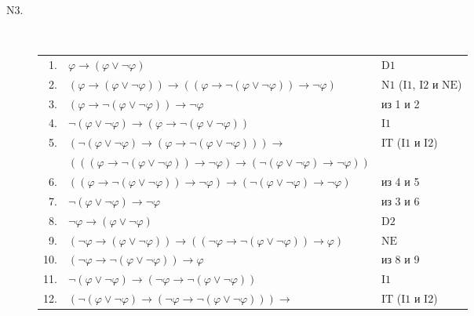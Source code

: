 \documentclass[12pt,a4paper]{article}
\begin{document}
\begin{enumproblem}
\begin{description}
            \item[$\mathrm{N3}$.]\ 
                \begin{center}
                    \begin{tabular}{rll}
                        1.& $\varphi \rightarrow (\varphi \vee \neg \varphi)$& $\mathrm{D1}$\\
                        2.& $(\varphi \rightarrow (\varphi \vee \neg \varphi)) \rightarrow ((\varphi \rightarrow \neg (\varphi \vee \neg \varphi)) \rightarrow \neg \varphi)$& $\mathrm{N1}$ ($\mathrm{I1}$, $\mathrm{I2}$ и $\mathrm{NE}$)\\
                        3.& $(\varphi \rightarrow \neg (\varphi \vee \neg \varphi)) \rightarrow \neg \varphi$& из 1 и 2\\
                        4.& $\neg (\varphi \vee \neg \varphi) \rightarrow (\varphi \rightarrow \neg (\varphi \vee \neg \varphi))$& $\mathrm{I1}$\\
                        5.& $(\neg (\varphi \vee \neg \varphi) \rightarrow (\varphi \rightarrow \neg (\varphi \vee \neg \varphi))) \rightarrow$& $\mathrm{IT}$ ($\mathrm{I1}$ и $\mathrm{I2}$)\\
                        &$(((\varphi \rightarrow \neg (\varphi \vee \neg \varphi)) \rightarrow \neg \varphi) \rightarrow (\neg (\varphi \vee \neg \varphi) \rightarrow \neg \varphi))$&\\
                        6.& $((\varphi \rightarrow \neg (\varphi \vee \neg \varphi)) \rightarrow \neg \varphi) \rightarrow (\neg (\varphi \vee \neg \varphi) \rightarrow \neg \varphi)$& из 4 и 5\\
                        7.& $\neg (\varphi \vee \neg \varphi) \rightarrow \neg \varphi$& из 3 и 6\\
                        8.& $\neg \varphi \rightarrow (\varphi \vee \neg \varphi)$& $\mathrm{D2}$\\
                        9.& $(\neg \varphi \rightarrow (\varphi \vee \neg \varphi)) \rightarrow ((\neg \varphi \rightarrow \neg (\varphi \vee \neg \varphi)) \rightarrow \varphi)$& $\mathrm{NE}$\\
                        10.& $(\neg \varphi \rightarrow \neg (\varphi \vee \neg \varphi)) \rightarrow \varphi$& из 8 и 9\\
                        11.& $\neg (\varphi \vee \neg \varphi) \rightarrow (\neg \varphi \rightarrow \neg (\varphi \vee \neg \varphi))$& $\mathrm{I1}$\\
                        12.& $(\neg (\varphi \vee \neg \varphi) \rightarrow (\neg \varphi \rightarrow \neg (\varphi \vee \neg \varphi))) \rightarrow$& $\mathrm{IT}$ ($\mathrm{I1}$ и $\mathrm{I2}$)\\

\end{tabular}
\end{center}
\end{description}
\end{enumproblem}
\end{document}
